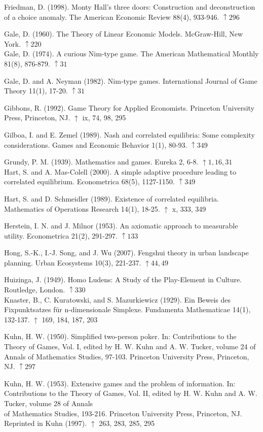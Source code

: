 \documentclass[12pt]{article}
\begin{document}
Friedman, D. (1998). Monty Hall's three doors: Construction and deconstruction of a choice anomaly. The American Economic Review 88(4), 933-946. $\uparrow 296$

Gale, D. (1960). The Theory of Linear Economic Models. McGraw-Hill, New York. $\uparrow 220$\\
Gale, D. (1974). A curious Nim-type game. The American Mathematical Monthly 81(8), 876-879. $\uparrow 31$

Gale, D. and A. Neyman (1982). Nim-type games. International Journal of Game Theory 11(1), 17-20. $\uparrow 31$

Gibbons, R. (1992). Game Theory for Applied Economists. Princeton University Press, Princeton, NJ. $\uparrow$ ix, 74, 98, 295

Gilboa, I. and E. Zemel (1989). Nash and correlated equilibria: Some complexity considerations. Games and Economic Behavior 1(1), 80-93. $\uparrow 349$

Grundy, P. M. (1939). Mathematics and games. Eureka 2, 6-8. $\uparrow 1,16,31$\\
Hart, S. and A. Mas-Colell (2000). A simple adaptive procedure leading to correlated equilibrium. Econometrica 68(5), 1127-1150. $\uparrow 349$

Hart, S. and D. Schmeidler (1989). Existence of correlated equilibria. Mathematics of Operations Research 14(1), 18-25. $\uparrow$ x, 333, 349

Herstein, I. N. and J. Milnor (1953). An axiomatic approach to measurable utility. Econometrica 21(2), 291-297. $\uparrow 133$

Hong, S.-K., I.-J. Song, and J. Wu (2007). Fengshui theory in urban landscape planning. Urban Ecosystems 10(3), 221-237. $\uparrow 44,49$

Huizinga, J. (1949). Homo Ludens: A Study of the Play-Element in Culture. Routledge, London. $\uparrow 330$\\
Knaster, B., C. Kuratowski, and S. Mazurkiewicz (1929). Ein Beweis des Fixpunktsatzes für n-dimensionale Simplexe. Fundamenta Mathematicae 14(1), 132-137. $\uparrow$ 169, 184, 187, 203

Kuhn, H. W. (1950). Simplified two-person poker. In: Contributions to the Theory of Games, Vol. I, edited by H. W. Kuhn and A. W. Tucker, volume 24 of Annals of Mathematics Studies, 97-103. Princeton University Press, Princeton, NJ. $\uparrow 297$

Kuhn, H. W. (1953). Extensive games and the problem of information. In: Contributions to the Theory of Games, Vol. II, edited by H. W. Kuhn and A. W. Tucker, volume 28 of Annals\\
of Mathematics Studies, 193-216. Princeton University Press, Princeton, NJ. Reprinted in Kuhn (1997). $\uparrow$ 263, 283, 285, 295
\end{document}
